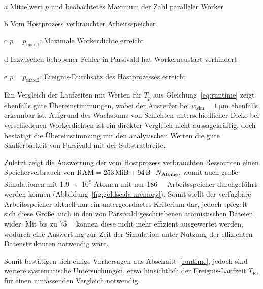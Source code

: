 \begin{table}[b!]
\begin{threeparttable}
    \begin{tablenotes}
    \item[a] Mittelwert $p$ und beobachtetes Maximum der Zahl paralleler Worker
    \item[b] Vom Hostprozess verbrauchter Arbeitsspeicher.
    \item[c] $p = p_\text{max,1}$: Maximale Workerdichte erreicht
    \item[d] Inzwischen behobener Fehler in Parsivald hat Workerneustart verhindert
    \item[e] $p = p_\text{max,2}$: Ereignis-Durchsatz des Hostprozesses erreicht
    \end{tablenotes}

  \end{threeparttable}
\end{table}

Ein Vergleich der Laufzeiten mit Werten für $T_p$ aus Gleichung~\ref{eq:runtime} zeigt ebenfalls gute Übereinstimmungen, wobei der Ausreißer bei $w_\text{sim} = \SI{1}{\micro\meter}$ ebenfalls erkennbar ist.%
Aufgrund des Wachstums von Schichten unterschiedlicher Dicke bei verschiedenen Workerdichten ist ein direkter Vergleich nicht aussagekräftig, doch bestätigt die Übereinstimmung mit den analytischen Werten die gute Skalierbarkeit von Parsivald mit der Substratbreite.

Zuletzt zeigt die Auswertung der vom Hostprozess verbrauchten Ressourcen einen Speicherverbrauch von $\text{RAM} = \SI{253}{\mebi\byte} + \SI{94}{\byte} \cdot N_\text{Atome}$, womit auch große Simulationen mit \num{1.9e9} Atomen mit nur \SI{186}{\gibi\byte} Arbeitsspeicher durchgeführt werden können (Abbildung~\ref{fig:goldscala-memory}).
Somit stellt der verfügbare Arbeitsspeicher aktuell nur ein untergeordnetes Kriterium dar, jedoch spiegelt sich diese Größe auch in den von Parsivald geschriebenen atomistischen Dateien wider.
Mit bis zu \SI{75}{\gibi\byte} können diese nicht mehr effizient ausgewertet werden, wodurch eine Auswertung zur Zeit der Simulation unter Nutzung der effizienten Datenstrukturen notwendig wäre.

Somit bestätigen sich einige Vorhersagen aus Abschnitt~\ref{runtime}, jedoch sind weitere systematische Untersuchungen, etwa hinsichtlich der Ereignis-Laufzeit $T_\text{E}$, für einen umfassenden Vergleich notwendig.

\vspace{2em}

